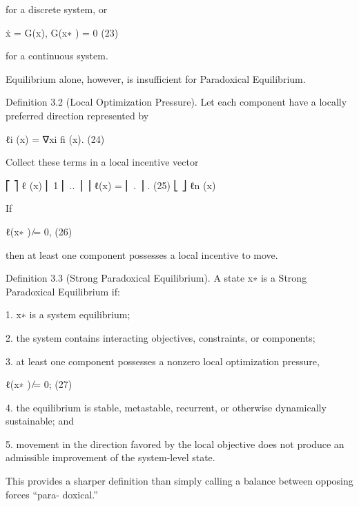 \documentclass[10pt,a4paper]{article}
\begin{document}
\begin{ManuscriptText}
for a discrete system, or


                                      ẋ = G(x),          G(x∗ ) = 0                         (23)


for a continuous system.

Equilibrium alone, however, is insufficient for Paradoxical Equilibrium.

Definition 3.2 (Local Optimization Pressure). Let each component have a locally preferred
direction represented by


                                          ℓi (x) = ∇xi fi (x).                                  (24)

Collect these terms in a local incentive vector

                                                  ⎡          ⎤
                                                   ℓ (x)
                                                  ⎢ 1
                                                  ⎢ .. ⎥
                                                         ⎥
                                           ℓ(x) = ⎢ . ⎥ .                                       (25)
                                                  ⎣          ⎦
                                                    ℓn (x)

If


                                              ℓ(x∗ ) ̸= 0,                                      (26)

then at least one component possesses a local incentive to move.

Definition 3.3 (Strong Paradoxical Equilibrium). A state x∗ is a Strong Paradoxical Equilibrium
if:

      1. x∗ is a system equilibrium;

      2. the system contains interacting objectives, constraints, or components;

      3. at least one component possesses a nonzero local optimization pressure,

                                                 ℓ(x∗ ) ̸= 0;                                   (27)


      4. the equilibrium is stable, metastable, recurrent, or otherwise dynamically sustainable; and

      5. movement in the direction favored by the local objective does not produce an admissible
        improvement of the system-level state.

This provides a sharper definition than simply calling a balance between opposing forces “para-
doxical.”


\end{ManuscriptText}
\end{document}

